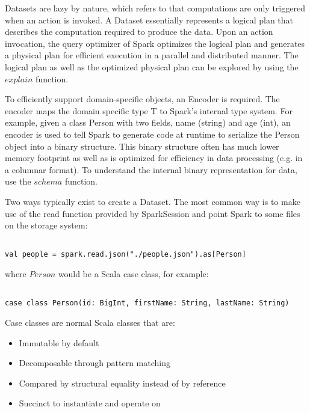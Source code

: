 \documentclass[main.tex]{thesis.tex}
\begin{document}
Datasets are lazy by nature, which refers to that computations are only triggered when an action is invoked.
A Dataset essentially represents a logical plan that describes the computation required to produce the data.
Upon an action invocation, the query optimizer of Spark optimizes the logical plan and generates a physical plan for efficient execution in a parallel and distributed manner.
The logical plan as well as the optimized physical plan can be explored by using the $explain$ function. \cite{spark-dataset}

To efficiently support domain-specific objects, an Encoder is required.
The encoder maps the domain specific type T to Spark's internal type system.
For example, given a class Person with two fields, name (string) and age (int), an encoder is used to tell Spark to generate code at runtime to serialize the Person object into a binary structure.
This binary structure often has much lower memory footprint as well as is optimized for efficiency in data processing (e.g. in a columnar format).
To understand the internal binary representation for data, use the $schema$ function. \cite{spark-dataset}

Two ways typically exist to create a Dataset.
The most common way is to make use of the read function provided by SparkSession and point Spark to some files on the storage system:

\lstset{
	frame=0,
	language=Scala,
	breaklines=true,
}

\begin{lstlisting}[caption=Creating a new Dataset by using read function]

val people = spark.read.json("./people.json").as[Person]

\end{lstlisting}

where $Person$ would be a Scala case class, for example:

\begin{lstlisting}[caption=Definition of case class Person]

case class Person(id: BigInt, firstName: String, lastName: String)

\end{lstlisting}

Case classes are normal Scala classes that are:

\begin{itemize}
	\item Immutable by default
	\item Decomposable through pattern matching
	\item Compared by structural equality instead of by reference
	\item Succinct to instantiate and operate on
\end{itemize}
\end{document}
